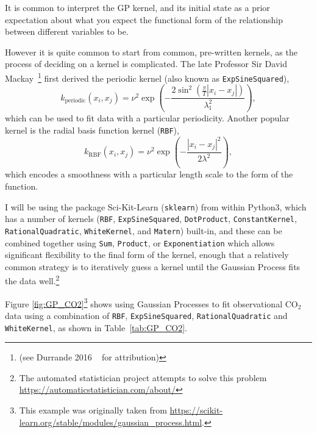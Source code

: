 \documentclass[usenames, dvipsnames, twocolumn]{article}
\begin{document}
It is common to interpret the GP kernel,
and its initial state as a prior expectation
about what you expect the functional form of the relationship between different
variables to be.

However it is quite common to start from common, pre-written kernels,
as the process of deciding on a kernel is complicated. The late Professor Sir David
Mackay~\cite{ITILA}\footnote{(see Durrande 2016 ~\cite{durrande2016detecting} for attribution)} first derived the periodic kernel (also known as \texttt{ExpSineSquared}),
\begin{equation} k_{\mathrm{periodic}}\left(x_{i}, x_{j}\right) =\nu^{2}
 \exp \left(-\frac{2 \sin ^{2}\left(\frac{\pi}{T}\left|x_{i}-x_{j}\right|\right)}{\lambda_{1}^{2}} \right), \end{equation}
which can be used to fit data with a particular periodicity. Another popular kernel is the radial basis function kernel (\texttt{RBF}),
\begin{equation} k_{\mathrm{RBF}}\left(x_{i}, x_{j}\right)=\nu^{2} \exp \left(-\frac{\left|x_{i}-x_{j}\right|^{2}}{2 \lambda^{2}}\right), \end{equation}
which encodes a smoothness with a particular length scale to the form of the function.

I will be using the package Sci-Kit-Learn (\texttt{sklearn}) from within Python3, which has a number of kernels (\texttt{RBF}, \texttt{ExpSineSquared}, \texttt{DotProduct}, \texttt{ConstantKernel}, \texttt{RationalQuadratic}, \texttt{WhiteKernel},  and \texttt{Matern}) built-in, and these can be combined together using \texttt{Sum}, \texttt{Product}, or \texttt{Exponentiation} which allows significant flexibility to the final form of the kernel, enough that a relatively common strategy is to iteratively guess
a kernel until the Gaussian Process fits the data well.\footnote{The automated statistician project attempts to solve this problem \url{https://automaticstatistician.com/about/}}

 Figure \ref{fig:GP_CO2}\footnote{
    This example was originally taken from
    \href{https://scikit-learn.org/stable/modules/gaussian_process.html}{https://scikit-learn.org/stable/modules/gaussian\_process.html}.}
shows using Gaussian Processes to fit observational CO$_2$ data using a
combination of \texttt{RBF}, \texttt{ExpSineSquared}, \texttt{RationalQuadratic}
 and \texttt{WhiteKernel},
as shown in Table~\ref{tab:GP_CO2}.
\end{document}
